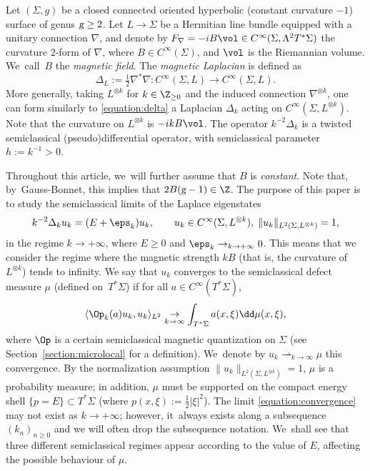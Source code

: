 Let $(\Sigma,g)$ be a closed connected oriented hyperbolic (constant curvature $-1$) surface of genus $\textsl{g} \geq 2$. Let $L \to \Sigma$ be a Hermitian line bundle equipped with a unitary connection $\nabla$, and denote by $F_\nabla = -i B \vol \in C^\infty(\Sigma, \Lambda^2 T^*\Sigma)$ the curvature $2$-form of $\nabla$, where $B \in C^\infty(\Sigma)$, and $\vol$ is the Riemannian volume. We~call~$B$ the \emph{magnetic field}. The \emph{magnetic Laplacian} is defined as
\begin{equation}
\label{equation:delta}
\Delta_L := \tfrac{1}{2} \nabla^* \nabla : C^\infty(\Sigma,L) \to C^\infty(\Sigma,L).
\end{equation}
More generally, taking $L^{\otimes k}$ for $k \in \Z_{\geq 0}$ and the induced connection $\nabla^{\otimes k}$, one can form similarly to \eqref{equation:delta} a Laplacian $\Delta_k$ acting on $C^\infty(\Sigma,L^{\otimes k})$. {\color{black}Note that the curvature on $L^{\otimes k}$ is $-ikB\vol$.} The operator $k^{-2}\Delta_k$ is a twisted semiclassical (pseudo)differential operator, with semiclassical parameter $h := k^{-1} > 0$.

Throughout this article, we~will further assume that $B$ is \emph{constant}. Note that, by~Gauss-Bonnet, this implies that $2B(\textsl{g}-1) \in \Z$. The purpose of this paper is to study the semiclassical limits of the Laplace eigenstates
\begin{equation}
\label{equation:eigenstates}
k^{-2}\Delta_k u_k = (E+\eps_k)u_k, \qquad u_k \in C^\infty(\Sigma,L^{\otimes
k}), \; \|u_k\|_{L^2(\Sigma,L^{\otimes k})} = 1,
\end{equation}
in the regime $k \to +\infty$, where $E \geq 0$ and $\eps_k \to_{k \to +\infty} 0$. {\color{black}This means that we consider the regime where the magnetic strength $kB$ (that is, the curvature of $L^{\otimes k}$) tends to infinity.} We say that $u_k$ converges to the semiclassical defect measure $\mu$ (defined on~$T^*\Sigma$) if for all $a \in C^\infty(T^*\Sigma)$,
\begin{equation}
\label{equation:convergence}
\langle\Op_{k}(a)u_{k},u_{k}\rangle_{L^2} \underset{k \to \infty}\to \int_{T^*\Sigma} a(x,\xi) \dd\mu(x,\xi),
\end{equation}
where $\Op$ is a certain semiclassical magnetic quantization on $\Sigma$ (see Section~\ref{section:microlocal} for a definition). We~denote by $u_k \rightharpoonup_{k \to \infty} \mu$ this convergence. By the normalization assumption $\|u_k\|_{L^2(\Sigma,L^{\otimes k})} = 1$, $\mu$ is a probability measure; in addition, $\mu$ must be supported on the compact energy shell $\{p=E\} \subset T^*\Sigma$ (where $p(x,\xi) := \tfrac{1}{2}|\xi|^2$). The limit \eqref{equation:convergence} may not exist as $k \to +\infty$; however, it~always exists along a subsequence $(k_n)_{n \geq 0}$ and we will often drop the subsequence notation. We~shall see that three different semiclassical regimes appear according to the value of $E$, affecting the possible behaviour of $\mu$.

